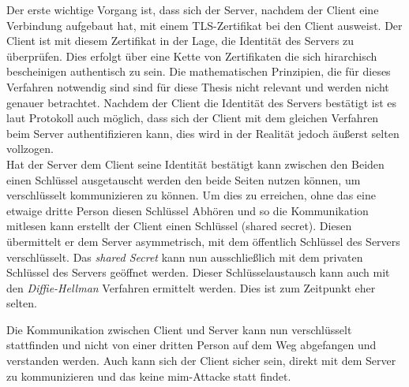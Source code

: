 Der erste wichtige Vorgang ist, dass sich der Server, nachdem der Client eine Verbindung aufgebaut hat, mit einem TLS-Zertifikat bei den Client ausweist.
Der Client ist mit diesem Zertifikat in der Lage, die Identität des Servers zu überprüfen.
Dies erfolgt über eine Kette von Zertifikaten die sich hirarchisch bescheinigen authentisch zu sein.
Die mathematischen Prinzipien, die für dieses Verfahren notwendig sind sind für diese Thesis nicht relevant und werden nicht genauer betrachtet.
Nachdem der Client die Identität des Servers bestätigt ist es laut Protokoll auch möglich, dass sich der Client mit dem gleichen Verfahren beim Server authentifizieren kann, dies wird in der Realität jedoch äußerst selten vollzogen.\\

Hat der Server dem Client seine Identität bestätigt kann zwischen den Beiden einen Schlüssel ausgetauscht werden den beide Seiten nutzen können, um verschlüsselt kommunizieren zu können.
Um dies zu erreichen, ohne das eine etwaige dritte Person diesen Schlüssel Abhören und so die Kommunikation mitlesen kann erstellt der Client einen Schlüssel (shared secret).
Diesen übermittelt er dem Server asymmetrisch, mit dem öffentlich Schlüssel des Servers verschlüsselt.
Das \textit{shared Secret} kann nun ausschließlich mit dem privaten Schlüssel des Servers geöffnet werden.
Dieser Schlüsselaustausch kann auch mit den \textit{Diffie-Hellman} Verfahren ermittelt werden.
Dies ist zum Zeitpunkt eher selten.

Die Kommunikation zwischen Client und Server kann nun verschlüsselt stattfinden und nicht von einer dritten Person auf dem Weg abgefangen und verstanden werden.
Auch kann sich der Client sicher sein, direkt mit dem Server zu kommunizieren und das keine \ac{mim}-Attacke statt findet.

\pagebreak